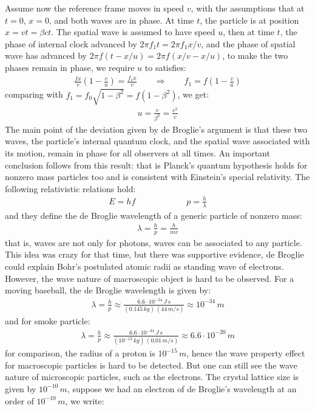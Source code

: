 \documentclass[11pt]{article}
\theoremstyle{break}
\theoremstyle{break}
\newcommand{\ee}[1]{\cdot 10^{#1}}
\begin{document}
Assume now the reference frame moves in speed $v$, with the assumptions that at $t=0$, $x=0$, and both waves are in phase. At time $t$, the particle is at position $x=vt = \beta ct$. The spatial wave is assumed to have speed $u$, then at time $t$, the phase of internal clock advanced by $2\pi f_1 t = 2\pi f_1 x/v$, and the phase of spatial wave has advanced by $2\pi f(t-x/u) =2\pi f(x/v- x/u)$, to make the two phases remain in phase, we require $u$ to satisfies:
\begin{align*}
\frac{fx}{v}\left(1- \frac{v}{u}\right) = \frac{f_1 x}{v}\qquad \Rightarrow \qquad f_1 = f\left( 1 - \frac{v}{u}\right)
\end{align*}
comparing with $f_1 = f_0\sqrt{1-\beta^2} = f(1-\beta^2)$, we get:
\begin{align*}
u = \frac{v}{\beta^2} = \frac{c^2}{v}
\end{align*}
The main point of the deviation given by de Broglie's argument is that these two waves, the particle's internal quantum clock, and the spatial wave associated with its motion, remain in phase for all observers at all times. An important
conclusion follows from this result: that is Planck's quantum hypothesis holds for nonzero mass particles too and is consistent with Einstein's special relativity. The following relativistic relations hold:
\begin{align*}
E = hf \qquad \qquad \qquad p = \frac{h}{\lambda}
\end{align*}
and they define the de Broglie wavelength of a generic particle of nonzero mass:
\begin{align*}
\lambda = \frac{h}{p} = \frac{h}{mv}
\end{align*}
that is, waves are not only for photons, waves can be associated to any particle. This idea was crazy for that time, but there was supportive evidence, de Broglie could explain Bohr's postulated atomic radii as standing wave of electrons. However, the wave nature of macroscopic object is hard to be observed. For a moving baseball, the de Broglie wavelength is given by:
\begin{align*}
\lambda = \frac{h}{p} \approx \frac{6.6\ee{-34}\, J\,s}{(0.145\, kg)\, (44\, m/s)} \approx 10^{-34}\, m
\end{align*}
and for smoke particle:
\begin{align*}
\lambda = \frac{h}{p} \approx \frac{6.6\ee{-34}\, J\,s}{(10^{-12}\, kg)\, (0.01\, m/s)} \approx 6.6\ee{-20}\, m
\end{align*}
for comparison, the radius of a proton is $10^{-15}\, m$, hence the wave property effect for macroscopic particles is hard to be detected. But one can still see the wave nature of microscopic particles, such as the electrons. The crystal lattice size is given by $10^{-10}\, m$, suppose we had an electron of de Broglie's wavelength at an order of $10^{-10}\, m$, we write:
\end{document}
